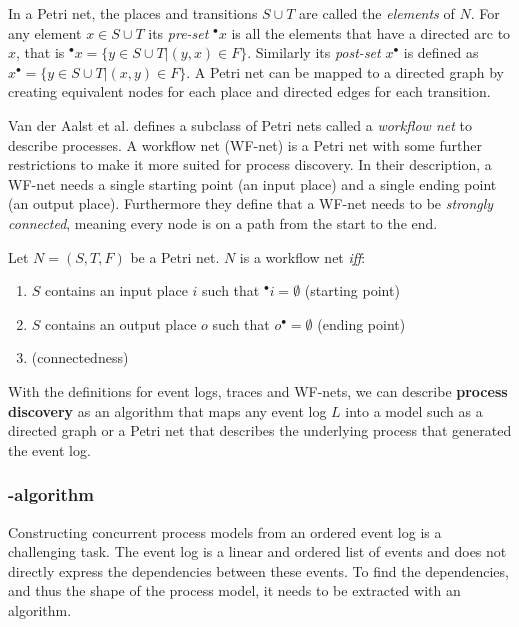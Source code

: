 In a Petri net, the places and transitions $S \cup T$ are called the \emph{elements} of $N$.
For any element $x \in S \cup T$ its \emph{pre-set} ${}^\bullet x$ is all the elements that have a directed arc to $x$, that is ${}^\bullet x = \{y \in S \cup T | (y,x) \in F\}$. Similarly its \emph{post-set} $x^\bullet$ is defined as 
$x^\bullet = \{y \in S \cup T | (x,y) \in F\}$.
A Petri net can be mapped to a directed graph by creating equivalent nodes for each place and directed edges for each transition.

Van der Aalst et al. \cite{van2013discovering} defines a subclass of Petri nets called a \emph{workflow net} to describe processes. A workflow net (WF-net) is a Petri net with some further restrictions to make it more suited for process discovery. In their description, a WF-net needs a single starting point (an input place) and a single ending point (an output place). Furthermore they define that a WF-net needs to be \emph{strongly connected}, meaning every node is on a path from the start to the end.

\begin{definition}
Let $N = (S, T, F)$ be a Petri net. $N$ is a workflow net \emph{iff}:
\begin{enumerate}
    \item $S$ contains an input place $i$ such that ${}^\bullet i = \emptyset$ (starting point)
    \item $S$ contains an output place $o$ such that $o^\bullet = \emptyset$ (ending point)
    \item {} (connectedness)
\end{enumerate}
\end{definition}

With the definitions for event logs, traces and WF-nets, we can describe \textbf{process discovery} as an algorithm that maps any event log $L$ into a model such as a directed graph or a Petri net that describes the underlying process that generated the event log.

\subsubsection{\textalpha-algorithm}
\label{sec:alphaalgorithm}
Constructing concurrent process models from an ordered event log is a challenging task.
The event log is a linear and ordered list of events and does not directly express the dependencies between these events.
To find the dependencies, and thus the shape of the process model, it needs to be extracted with an algorithm.

